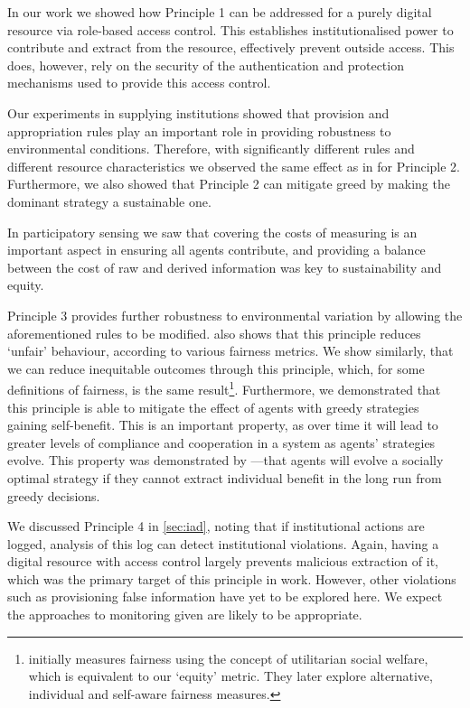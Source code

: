 In our work we showed how Principle 1 can be addressed for a purely digital resource via
role-based access control. This establishes institutionalised power to
contribute and extract from the resource, effectively prevent outside access.
This does, however, rely on the security of the authentication and
protection mechanisms used to provide this access control. 

Our experiments in supplying institutions showed that provision and
appropriation rules play an important role in providing robustness to
environmental conditions. Therefore, with significantly different rules and
different resource characteristics we observed the same effect as in
\citet{Pitt2012b} for Principle 2. Furthermore, we also showed that Principle 2
can mitigate greed by making the dominant strategy a sustainable one.

In participatory sensing we saw that covering the costs of measuring is an
important aspect in ensuring all agents contribute, and providing a balance
between the cost of raw and derived information was key to sustainability and
equity.

Principle 3 provides further robustness to environmental variation by allowing
the aforementioned rules to be modified. \citet{Schaumeier2013} also shows
that this principle reduces `unfair' behaviour, according to various fairness
metrics. We show similarly, that we can reduce inequitable outcomes through
this principle, which, for some definitions of fairness, is the same
result\footnote{\citet{Schaumeier2013} initially measures fairness using the
concept of utilitarian social welfare, which is equivalent to our `equity'
metric. They later explore alternative, individual and self-aware fairness
measures.}. Furthermore, we demonstrated that this principle is able to mitigate the
effect of agents with greedy strategies gaining self-benefit. This is an
important property, as over time it will lead to greater levels of compliance
and cooperation in a system as agents' strategies evolve. This property was
demonstrated by \citet{Axelrod1984}---that agents will evolve a socially
optimal strategy if they cannot extract individual benefit in the long run
from greedy decisions.

We discussed Principle 4 in \autoref{sec:iad}, noting that if institutional
actions are logged, analysis of this log can detect institutional violations.
Again, having a digital resource with access control largely prevents
malicious extraction of it, which was the primary target of this principle in
 work. However, other violations such as
provisioning false information have yet to be explored here. We expect the
approaches to monitoring given are likely to be appropriate. %

